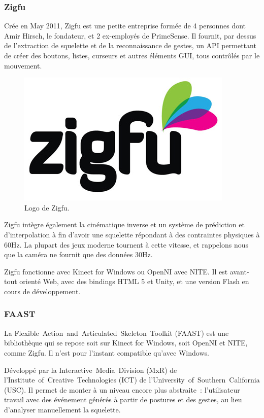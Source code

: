 \subsubsection{Zigfu}
Crée en May 2011, Zigfu est une petite entreprise formée de 4 personnes dont 
Amir Hirsch, le fondateur, et 2 ex-employés de PrimeSense. Il fournit, 
par dessus de l'extraction de squelette et de la reconnaissance
de gestes, un API permettant de créer des boutons, listes, curseurs et autres
éléments GUI, tous contrôlés par le mouvement.
\begin{figure}[h!]
\centering
\includegraphics[width=0.3\linewidth]{images/zigfu_logo}
\caption{Logo de Zigfu.}
\end{figure}
Zigfu intègre également la cinématique inverse et un système de 
prédiction et
d'interpolation à fin d'avoir une squelette répondant à des contraintes 
physiques à 60Hz. La plupart des jeux moderne tournent à cette vitesse, et 
rappelons nous que la caméra ne fournit que des données 30Hz.

Zigfu fonctionne avec Kinect for Windows ou OpenNI avec NITE. Il est 
avant-tout orienté Web, avec des
bindings HTML 5 et Unity, et une version Flash en cours de développement.


\subsubsection{FAAST}
La Flexible~Action~and~Articulated~Skeleton~Toolkit (FAAST) est une 
bibliothèque qui se repose soit sur Kinect for Windows, soit OpenNI et NITE, 
comme Zigfu. Il n'est pour l'instant compatible qu'avec Windows.

Développé par la Interactive~Media~Division (MxR) de 
l'Institute~of~Creative~Technologies (ICT) de 
l'University~of~Southern~California (USC). Il permet de monter à un niveau 
encore plus abstraite~: l'utilisateur travail avec des événement générés à
partir de postures et des gestes, au lieu d'analyser manuellement la 
squelette.

